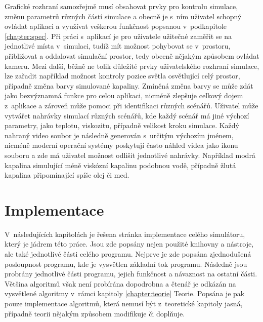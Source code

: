 Grafické rozhraní samozřejmě musí obsahovat prvky pro kontrolu simulace, změnu parametrů různých částí simulace a obecně je s~ním uživatel schopný ovládat aplikaci a využívat veškerou funkčnost popsanou v~podkapitole \ref{chapter:spec}. Při práci s~aplikací je pro uživatele užitečné zaměřit se na jednotlivé místa v~simulaci, tudíž mít možnost pohybovat se v~prostoru, přibližovat a oddalovat simulační prostor, tedy obecně nějakým způsobem ovládat kameru. Mezi další, běžně ne tolik důležité prvky uživatelského rozhraní simulace, lze zařadit například možnost kontroly pozice světla osvětlující celý prostor, případně změna barvy simulované kapaliny. Zmíněná změna barvy se může zdát jako bezvýznamná funkce pro celou aplikaci, nicméně zlepšuje celkový dojem z~aplikace a zároveň může pomoci při identifikaci různých scénářů. Uživatel může vytvářet nahrávky simulací různých scénářů, kde každý scénář má jiné výchozí parametry, jako teplotu, viskozitu, případně velikost kroku simulace. Každý nahraný video soubor je následně generován s~určitým výchozím jménem, nicméně moderní operační systémy poskytují často náhled videa jako ikonu souboru a zde má uživatel možnost odlišit jednotlivé nahrávky. Například modrá kapalina simulující méně viskózní kapalinu podobnou vodě, případně žlutá kapalina připomínající spíše olej či med.

\chapter{Implementace}
\label{chapter:implementace}
V~následujících kapitolách je řešena stránka implementace celého simulátoru, který je jádrem této práce. Jsou zde popsány nejen použité knihovny a nástroje, ale také jednotlivé části celého programu. Nejprve je zde popsána zjednodušená posloupnost programu, kde je vysvětlen základní tok programu. Následně jsou probrány jednotlivé části programu, jejich funkčnost a návaznost na ostatní části. Většina algoritmů však není probírána dopodrobna a čtenář je odkázán na vysvětlené algoritmy v~rámci kapitoly \ref{chapter:teorie} Teorie. Popsána je pak pouze implementace algoritmů, která nemusí být z~teoretické kapitoly jasná, případně teorii nějakým způsobem modifikuje či doplňuje.

